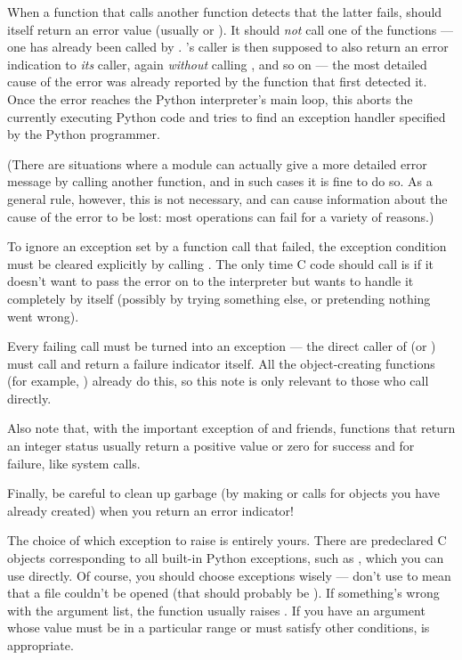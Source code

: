 When a function  that calls another function  detects
that the latter fails,  should itself return an error value
(usually \NULL{} or ).  It should \emph{not} call one of the
 functions --- one has already been called by .
's caller is then supposed to also return an error indication
to \emph{its} caller, again \emph{without} calling ,
and so on --- the most detailed cause of the error was already
reported by the function that first detected it.  Once the error
reaches the Python interpreter's main loop, this aborts the currently
executing Python code and tries to find an exception handler specified
by the Python programmer.

(There are situations where a module can actually give a more detailed
error message by calling another  function, and in
such cases it is fine to do so.  As a general rule, however, this is
not necessary, and can cause information about the cause of the error
to be lost: most operations can fail for a variety of reasons.)

To ignore an exception set by a function call that failed, the exception
condition must be cleared explicitly by calling . 
The only time C code should call  is if it doesn't
want to pass the error on to the interpreter but wants to handle it
completely by itself (possibly by trying something else, or pretending
nothing went wrong).

Every failing  call must be turned into an
exception --- the direct caller of  (or
) must call  and
return a failure indicator itself.  All the object-creating functions
(for example, ) already do this, so this
note is only relevant to those who call  directly.

Also note that, with the important exception of
 and friends, functions that return an
integer status usually return a positive value or zero for success and
 for failure, like \UNIX{} system calls.

Finally, be careful to clean up garbage (by making
 or  calls for objects
you have already created) when you return an error indicator!

The choice of which exception to raise is entirely yours.  There are
predeclared C objects corresponding to all built-in Python exceptions,
such as , which you can use directly.
Of course, you should choose exceptions wisely --- don't use
 to mean that a file couldn't be opened (that
should probably be ).  If something's wrong with
the argument list, the  function usually
raises .  If you have an argument whose value
must be in a particular range or must satisfy other conditions,
 is appropriate.

